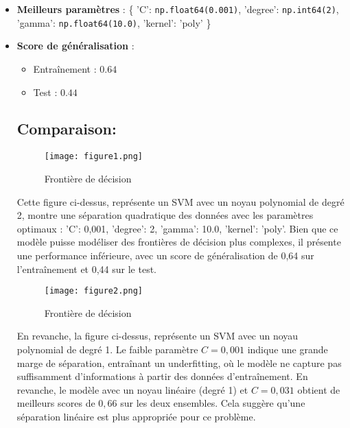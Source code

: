 \documentclass{article}
\begin{document}
\begin{itemize}
    \item \textbf{Meilleurs paramètres} : \{ 'C': \texttt{np.float64(0.001)}, 'degree': \texttt{np.int64(2)}, 'gamma': \texttt{np.float64(10.0)}, 'kernel': 'poly' \}
    \item \textbf{Score de généralisation} :
    \begin{itemize}
        \item Entraînement : $0.64$
        \item Test : $0.44$
    \end{itemize}

\subsection{\textbf{Comparaison:}}

\begin{figure}[H]
    \centering
    \begin{minipage}{0.9\textwidth}
        \centering
        \texttt{[image: figure1.png]}
        \caption{Frontière de décision}
    \end{minipage}
    \end{figure}
Cette figure ci-dessus, représente un SVM avec un noyau polynomial de 
degré 
2, montre une séparation quadratique des données avec les paramètres 
optimaux 
: {'C': 0,001, 'degree': 2, 'gamma': 10.0, 'kernel': 'poly'}. Bien que ce 
modèle puisse modéliser des frontières de décision plus complexes, il 
présente une performance inférieure, avec un score de généralisation de
0,64 
sur l'entraînement et 0,44 sur le test.
 \begin{figure}[H]
    \centering
    \begin{minipage}{0.9\textwidth}
        \centering
        \texttt{[image: figure2.png]}
        \caption{Frontière de décision}
    \end{minipage}
    \end{figure}

En revanche, la figure ci-dessus, représente un SVM avec un noyau
polynomial 
de degré 1. Le faible paramètre \( C = 0,001 \) indique une grande marge 
de 
séparation, entraînant un underfitting, où le modèle ne capture pas 
suffisamment d'informations à partir des données d'entraînement. En 
revanche, 
le modèle avec un noyau linéaire (degré 1) et \( C = 0,031 \) obtient de 
meilleurs scores de \( 0,66 \) sur les deux ensembles. Cela suggère 
qu'une 
séparation linéaire est plus appropriée pour ce problème.


\end{itemize}
\end{document}
